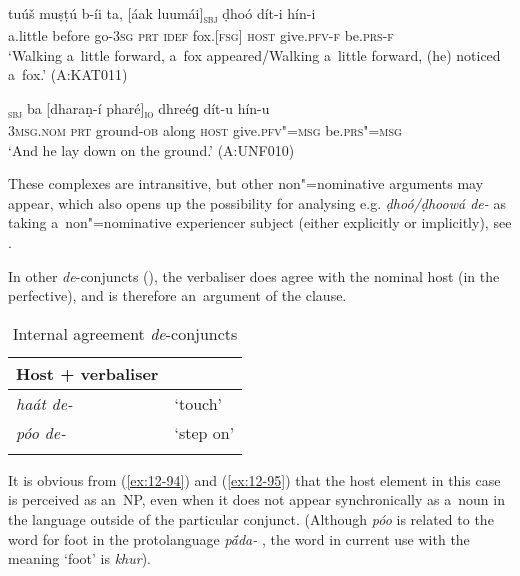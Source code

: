 \begin{exe}
\ex
\label{ex:12-92}
\gll tuúš muṣṭú b-íi ta, [áak luumái]\textsubscript{\textsc{sbj}} ḍhoó dít-i hín-i \\
a.little before go-\textsc{3sg} \textsc{prt} \textsc{idef} fox.[\textsc{fsg]} \textsc{host} give.\textsc{pfv-f} be.\textsc{prs-f} \\
\glt `Walking a~little forward, a~fox appeared/Walking a~little forward, (he) noticed a~fox.' (A:KAT011)
\end{exe}
\begin{exe}
\ex
\label{ex:12-93}
\gll [so]\textsubscript{\textsc{sbj}} ba [dharaṇ-í pharé]\textsubscript{\textsc{io}} dhreéɡ dít-u hín-u \\
\textsc{3msg.nom} \textsc{prt} ground-\textsc{ob} along \textsc{host}  give.\textsc{pfv"=msg} be.\textsc{prs"=msg} \\
\glt `And he lay down on the ground.' (A:UNF010)
\end{exe}

These complexes are intransitive, but other non"=nominative arguments may appear, which also opens up the possibility for analysing e.g. \textit{ḍhoó/ḍhoowá de-} as taking a~non"=nominative experiencer subject (either explicitly or implicitly), see . 


 In other \textit{de}-conjuncts (), the verbaliser does agree with the nominal host (in the perfective), and is therefore an~argument of the clause. 


\begin{table}[ht]
\caption{Internal agreement \textit{de}-conjuncts}
\begin{tabularx}{.5\textwidth}{ l@{\hspace{25pt}} Q }
\lspbottomrule
\textbf{Host + verbaliser} &
\\\hline
\textit{haát de-} &
`touch'\\
\textit{póo de-} &
`step on'\\\lspbottomrule
\end{tabularx}
\label{tab:12-8}
\end{table}


It is obvious from (\ref{ex:12-94}) and (\ref{ex:12-95}) that the host element in this case is
perceived as an~NP, even when it does not appear synchronically as a~noun in the language outside of
the particular conjunct. (Although \textit{póo} is related to the word for foot in the protolanguage
\textit{p\'{\={a}}da-} \citep[8056]{turner1966}, the word in current use with the meaning `foot' is
\textit{khur}).

